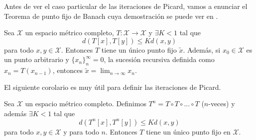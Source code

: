 Antes de ver el caso particular de las iteraciones de Picard, vamos a enunciar el Teorema de punto fijo de Banach cuya demostración se puede ver en \cite{Amster}.
\begin{thm}
Sea $\mathcal{X}$ un espacio métrico completo, $T:\mathcal{X}\to \mathcal{X}$ y  $\exists K<1$ tal que 
\begin{equation*}
    d(T[x],T[y])\leq Kd(x,y)    
\end{equation*}
para todo $x,y\in \mathcal{X}$. Entonces $T$ tiene un único punto fijo $\tilde{x}$. Además, si $x_0\in \mathcal{X}$ es un punto arbitrario y $\{x_{n}\}_n^\infty=0$, la sucesión recursiva definida como   $x_n=T(x_{n-1})$, entonces $\tilde{x}=\lim_{n\to \infty}x_n$.
\end{thm}
El siguiente corolario es muy útil para definir las iteraciones de Picard.
\begin{cor}\label{col:picard}
Sea $\mathcal{X}$ un espacio métrico completo. Definimos  $T^n=T\circ T\circ ...\circ T$ ($n$-veces) y además $\exists K<1$ tal que 
    \begin{equation*}
    d(T^n[x],T^n[y])\leq Kd(x,y)    
    \end{equation*}
para todo $x,y\in \mathcal{X}$ y para todo $n$. Entonces $T$ tiene un único punto fijo en $\mathcal{X}$.
\end{cor}
 

